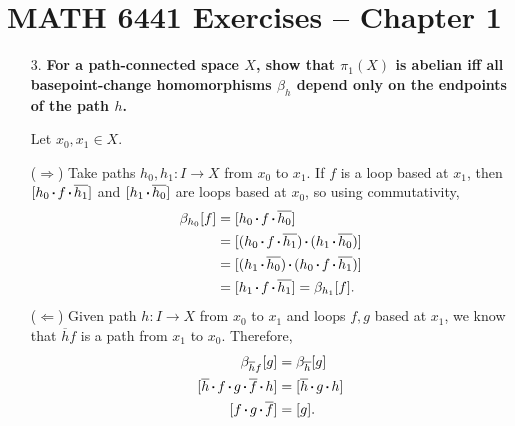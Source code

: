 \documentclass[a4paper,12pt]{article}
\newcommand*\sq{\mathbin{\vcenter{\hbox{\rule{.3ex}{.3ex}}}}}
\begin{document}
\section*{MATH 6441 Exercises -- Chapter 1}
\begin{enumerate}
    \item[3.]
        \boldmath\textbf{For a path-connected space $X$, show that $\pi_1(X)$ is abelian iff all basepoint-change homomorphisms $\beta_h$ depend only on the endpoints of the path $h$.
        }\unboldmath \par
        Let $x_0, x_1 \in X$. \par
        ($\Rightarrow$) Take paths $h_0, h_1 : I \to X$ from $x_0$ to $x_1$. If $f$ is a loop based at $x_1$, then $[h_0 \sq f \sq \overline{h_1}]$ and $[h_1 \sq \overline{h_0}]$ are loops based at $x_0$, so using commutativity,
        \begin{align*}
            \beta_{h_0}[f] &= [h_0 \sq f \sq \overline{h_0}] \\
            &= [(h_0 \sq f \sq \overline{h_1}) \sq (h_1 \sq \overline{h_0})] \\
            &= [(h_1 \sq \overline{h_0}) \sq (h_0 \sq f \sq \overline{h_1})] \\
            &= [h_1 \sq f \sq \overline{h_1}] = \beta_{h_1}[f].
        \end{align*}
        ($\Leftarrow$) Given path $h : I \to X$ from $x_0$ to $x_1$ and loops $f, g$ based at $x_1$, we know that $\overline{h} f$ is a path from $x_1$ to $x_0$. Therefore,
        \begin{align*}
            \beta_{\overline{h} f}[g] &= \beta_{\overline{h}}[g] \\
            [\overline{h} \sq f \sq g \sq \overline{f} \sq h] &= [\overline{h} \sq g \sq h] \\
            [f \sq g \sq \overline{f}] &= [g].
        \end{align*}


\end{enumerate}
\end{document}

